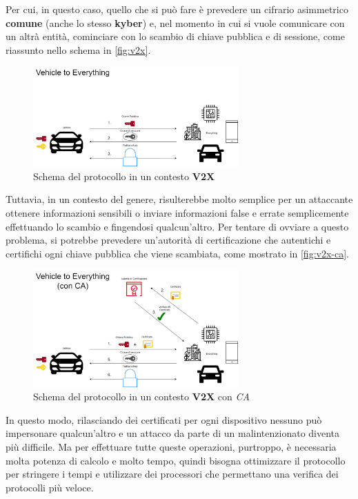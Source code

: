Per cui, in questo caso, quello che si può fare è prevedere un cifrario asimmetrico \textbf{comune} (anche lo stesso \textbf{kyber}) e, nel momento in cui si vuole comunicare con un altrà entità, cominciare con lo scambio di chiave pubblica e di sessione, come riassunto nello schema in \autoref{fig:v2x}.

\begin{figure}[h]
	\centering
	\includegraphics[width=0.7\textwidth]{capitoli/figure-conclusioni/v2x.png}
	\caption{Schema del protocollo in un contesto \textbf{V2X}}
	\label{fig:v2x}
\end{figure}

Tuttavia, in un contesto del genere, risulterebbe molto semplice per un attaccante ottenere informazioni sensibili o inviare informazioni false e errate semplicemente effettuando lo scambio e fingendosi qualcun'altro. Per tentare di ovviare a questo problema, si potrebbe prevedere un'autorità di certificazione che autentichi e certifichi ogni chiave pubblica che viene scambiata, come mostrato in \autoref{fig:v2x-ca}.

\begin{figure}[h]
	\centering
	\includegraphics[width=0.7\textwidth]{capitoli/figure-conclusioni/v2x-ca.png}
	\caption{Schema del protocollo in un contesto \textbf{V2X} con \emph{CA}}
	\label{fig:v2x-ca}
\end{figure}

In questo modo, rilasciando dei certificati per ogni dispositivo nessuno può impersonare qualcun'altro e un attacco da parte di un malintenzionato diventa più difficile. Ma per effettuare tutte queste operazioni, purtroppo, è necessaria molta potenza di calcolo e molto tempo, quindi bisogna ottimizzare il protocollo per stringere i tempi e utilizzare dei processori che permettano una verifica dei protocolli più veloce.

